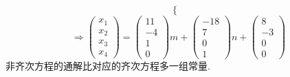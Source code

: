 \documentclass{article}
\begin{document}
\begin{enumerate}
\[\begin{cases}
            \end{cases}
            \]
            \[
            \Rightarrow
            \left(
                \begin{array}{ccc}
                    x_1\\
                    x_2\\
                    x_3\\
                    x_4
                \end{array}
            \right)
            =
            \left(
                \begin{array}{ccc}
                    11\\
                    -4\\
                    1\\
                    0
                \end{array}
            \right)
            m+
            \left(\begin{array}{ccc}
                    -18\\
                    7\\
                    0\\
                    1
                \end{array}\right)
            n+
            \left(\begin{array}{ccc}
                    8\\
                    -3\\
                    0\\
                    0
                \end{array}\right)
        \]
        非齐次方程的通解比对应的齐次方程多一组常量.
    \end{enumerate}
\end{document}
